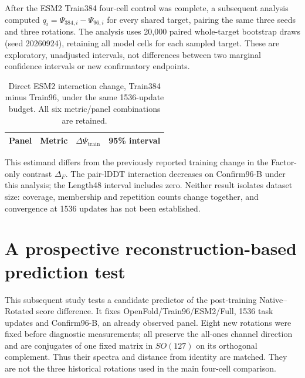 After the ESM2 Train384 four-cell control was complete, a subsequent analysis
computed $q_i=\Psi_{384,i}-\Psi_{96,i}$ for every shared target, pairing the same
three seeds and three rotations. The analysis uses 20,000 paired whole-target
bootstrap draws (seed 20260924), retaining all model cells for each sampled target. These are
exploratory, unadjusted intervals, not differences between two marginal
confidence intervals or new confirmatory endpoints.

\begin{table}[htbp]
\caption{Direct ESM2 interaction change, Train384 minus Train96, under the
same 1536-update budget. All six metric/panel combinations are retained.}
\centering\small
\begin{tabular}{llll}\toprule
Panel & Metric & $\Delta\Psi_{\mathrm{train}}$ & 95\% interval \\\midrule

\end{tabular}
\end{table}

This estimand differs from the previously reported training change in the
Factor-only contrast $\Delta_F$. The pair-lDDT interaction decreases on
Confirm96-B under this analysis; the Length48 interval includes zero. Neither
result isolates dataset size: coverage, membership and repetition counts change
together, and convergence at 1536 updates has not been established.


\clearpage
\section{A prospective reconstruction-based prediction test}
\label{app:prediction_e1}
This subsequent study tests a candidate predictor of the post-training
Native--Rotated score difference. It fixes OpenFold/Train96/ESM2/Full,
1536 task updates and Confirm96-B, an already observed panel. Eight new
rotations were fixed before diagnostic measurements;
all preserve the all-ones channel direction and are conjugates of one fixed
matrix in $SO(127)$ on its orthogonal complement. Thus their spectra and distance
from identity are matched. They are not the three historical rotations used
in the main four-cell comparison.

